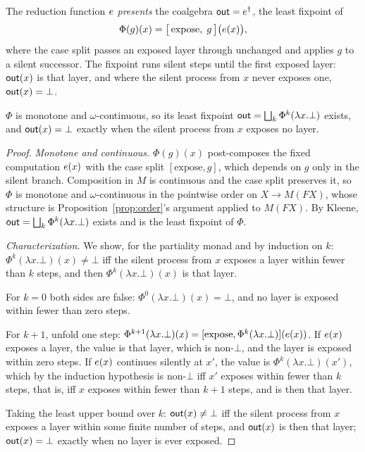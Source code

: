 \begin{definition}\label{def:out}
  The reduction function $e$ \emph{presents} the coalgebra $\mathsf{out} = e^{\dagger}$, the least fixpoint of
  \[
    \Phi(g)(x) = \big[\,\text{expose},\; g\,\big]\big(e(x)\big),
  \]
  where the case split passes an exposed layer through unchanged and applies $g$ to a silent successor. The fixpoint runs silent steps until the first exposed layer: $\mathsf{out}(x)$ is that layer, and where the silent process from $x$ never exposes one, $\mathsf{out}(x) = \bot$.
\end{definition}

\begin{proposition}\label{prop:out}
  $\Phi$ is monotone and $\omega$-continuous, so its least fixpoint
  $\mathsf{out} = \bigsqcup_k \Phi^k(\lambda x.\bot)$ exists, and $\mathsf{out}(x) = \bot$ exactly when the silent process from $x$ exposes no layer.
\end{proposition}
\begin{proof}
  \emph{Monotone and continuous.} $\Phi(g)(x)$ post-composes the fixed computation $e(x)$ with the case split $[\text{expose}, g]$, which depends on $g$ only in the silent branch. Composition in $M$ is continuous and the case split preserves it, so $\Phi$ is monotone and $\omega$-continuous in the pointwise order on $X \to M(F X)$, whose structure is Proposition~\ref{prop:order}'s argument applied to $M(F X)$. By Kleene, $\mathsf{out} = \bigsqcup_k \Phi^k(\lambda x.\bot)$ exists and is the least fixpoint of $\Phi$.

  \emph{Characterization.} We show, for the partiality monad and by induction on $k$: $\Phi^k(\lambda x.\bot)(x) \neq \bot$ iff the silent process from $x$ exposes a layer within fewer than $k$ steps, and then $\Phi^k(\lambda x.\bot)(x)$ is that layer.

  For $k = 0$ both sides are false: $\Phi^0(\lambda x.\bot)(x) = \bot$, and no layer is exposed within fewer than zero steps.

  For $k + 1$, unfold one step: $\Phi^{k+1}(\lambda x.\bot)(x) = [\text{expose}, \Phi^k(\lambda x.\bot)](e(x))$. If $e(x)$ exposes a layer, the value is that layer, which is non-$\bot$, and the layer is exposed within zero steps. If $e(x)$ continues silently at $x'$, the value is $\Phi^k(\lambda x.\bot)(x')$, which by the induction hypothesis is non-$\bot$ iff $x'$ exposes within fewer than $k$ steps, that is, iff $x$ exposes within fewer than $k + 1$ steps, and is then that layer.

  Taking the least upper bound over $k$: $\mathsf{out}(x) \neq \bot$ iff the silent process from $x$ exposes a layer within some finite number of steps, and $\mathsf{out}(x)$ is then that layer; $\mathsf{out}(x) = \bot$ exactly when no layer is ever exposed.
\end{proof}

